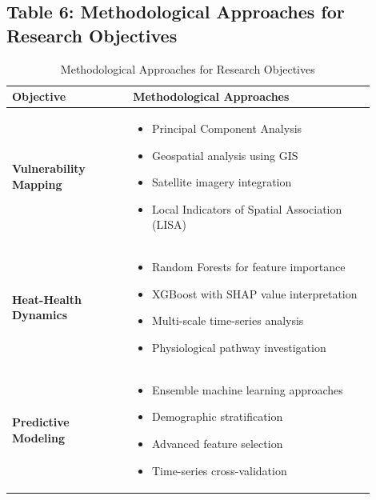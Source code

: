 \documentclass[12pt,a4paper,landscape]{article}
\begin{document}
\subsection*{Table 6: Methodological Approaches for Research Objectives}
\begin{table}[H]
\centering
\caption{Methodological Approaches for Research Objectives}
\label{tab:research_objectives}
\begin{tabular}{p{0.3\linewidth}p{0.6\linewidth}}
\toprule
\textbf{Objective} & \textbf{Methodological Approaches} \\
\midrule
\textbf{Vulnerability Mapping} & 
\begin{itemize}[leftmargin=*]
    \item Principal Component Analysis
    \item Geospatial analysis using GIS
    \item Satellite imagery integration
    \item Local Indicators of Spatial Association (LISA)
\end{itemize} \\
\midrule
\textbf{Heat-Health Dynamics} & 
\begin{itemize}[leftmargin=*]
    \item Random Forests for feature importance
    \item XGBoost with SHAP value interpretation
    \item Multi-scale time-series analysis
    \item Physiological pathway investigation
\end{itemize} \\
\midrule
\textbf{Predictive Modeling} & 
\begin{itemize}[leftmargin=*]
    \item Ensemble machine learning approaches
    \item Demographic stratification
    \item Advanced feature selection
    \item Time-series cross-validation
\end{itemize} \\
\bottomrule
\end{tabular}
\end{table}
\end{document}
